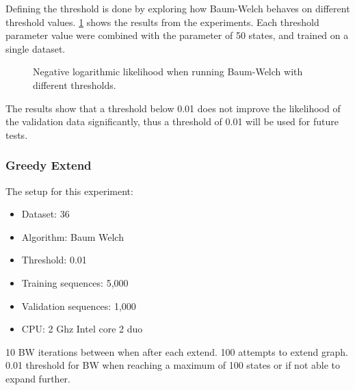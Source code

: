 Defining the threshold is done by exploring how Baum-Welch behaves on different threshold values. \ref{fig:threshold} shows the results from the experiments. Each threshold parameter value were combined with the parameter of 50 states, and trained on a single dataset.

\begin{figure}
\centering
\caption{Negative logarithmic likelihood when running Baum-Welch with different thresholds.}
\label{fig:threshold}
\end{figure}

The results show that a threshold below 0.01 does not improve the likelihood of the validation data significantly, thus a threshold of 0.01 will be used for future tests.

\subsubsection{Greedy Extend}

The setup for this experiment:
\begin{itemize}
\item Dataset: 36
\item Algorithm: Baum Welch
\item Threshold: 0.01
\item Training sequences: 5,000
\item Validation sequences: 1,000
\item CPU: 2 Ghz Intel core 2 duo
\end{itemize}

10 BW iterations between when after each extend.
100 attempts to extend graph.
0.01 threshold for BW when reaching a maximum of 100 states or if not able to expand further.


